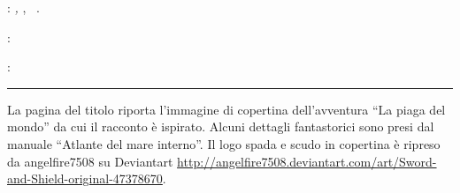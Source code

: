 \thispagestyle{empty}

\hfill

\vfill

\noindent\myName:
\textit{\myTitle,} \mySubTitle,
\textcopyright\ \myTime.

\medskip
{}: \\
\myUrl

\medskip
{}: \\
\mail{\myEmail}

\vspace{1cm}
\hrule
\bigskip

\noindent La pagina del titolo riporta l'immagine di copertina dell'avventura ``La piaga del mondo'' da cui il racconto \`e ispirato.
Alcuni dettagli fantastorici sono presi dal manuale ``Atlante del mare interno''.
Il logo spada e scudo in copertina \`e ripreso da angelfire7508 su Deviantart \url{http://angelfire7508.deviantart.com/art/Sword-and-Shield-original-47378670}.